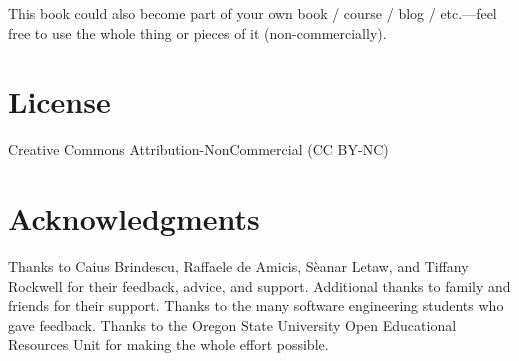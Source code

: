 \spacer
This book could also become part of your own book / course / blog / etc.---feel free to use the whole thing or pieces of it (non-commercially).

\section{License}
Creative Commons Attribution-NonCommercial (CC BY-NC)

\section{Acknowledgments}
Thanks to Caius Brindescu, Raffaele de Amicis, S\`{e}anar Letaw, and Tiffany Rockwell for their feedback, advice, and support. Additional thanks to family and friends for their support. Thanks to the many software engineering students who gave feedback. Thanks to the Oregon State University Open Educational Resources Unit for making the whole effort possible.